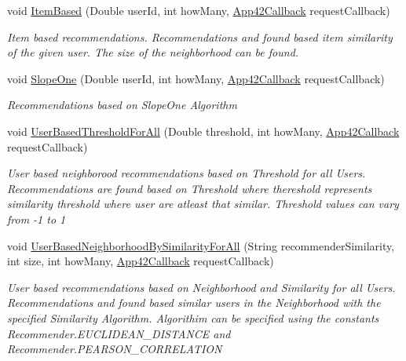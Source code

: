 \begin{DoxyCompactItemize}
void \hyperlink{classcom_1_1shephertz_1_1app42_1_1paas_1_1sdk_1_1windows_1_1recommend_1_1_recommender_service_ae8b92d81350f99f29cbaaeb1c139931e}{Item\+Based} (Double user\+Id, int how\+Many, \hyperlink{interfacecom_1_1shephertz_1_1app42_1_1paas_1_1sdk_1_1windows_1_1_app42_callback}{App42\+Callback} request\+Callback)
\begin{DoxyCompactList}\small\item\em Item based recommendations. Recommendations and found based item similarity of the given user. The size of the neighborhood can be found. \end{DoxyCompactList}\item 
void \hyperlink{classcom_1_1shephertz_1_1app42_1_1paas_1_1sdk_1_1windows_1_1recommend_1_1_recommender_service_ad9b1f1dbf68fb11d66477a5fc380e780}{Slope\+One} (Double user\+Id, int how\+Many, \hyperlink{interfacecom_1_1shephertz_1_1app42_1_1paas_1_1sdk_1_1windows_1_1_app42_callback}{App42\+Callback} request\+Callback)
\begin{DoxyCompactList}\small\item\em Recommendations based on Slope\+One Algorithm \end{DoxyCompactList}\item 
void \hyperlink{classcom_1_1shephertz_1_1app42_1_1paas_1_1sdk_1_1windows_1_1recommend_1_1_recommender_service_ad114e00882736dd6465af133a12eb93e}{User\+Based\+Threshold\+For\+All} (Double threshold, int how\+Many, \hyperlink{interfacecom_1_1shephertz_1_1app42_1_1paas_1_1sdk_1_1windows_1_1_app42_callback}{App42\+Callback} request\+Callback)
\begin{DoxyCompactList}\small\item\em User based neighborood recommendations based on Threshold for all Users. Recommendations are found based on Threshold where thereshold represents similarity threshold where user are atleast that similar. Threshold values can vary from -\/1 to 1 \end{DoxyCompactList}\item 
void \hyperlink{classcom_1_1shephertz_1_1app42_1_1paas_1_1sdk_1_1windows_1_1recommend_1_1_recommender_service_a7d2ec3c8474e5b1510e21e0212166228}{User\+Based\+Neighborhood\+By\+Similarity\+For\+All} (String recommender\+Similarity, int size, int how\+Many, \hyperlink{interfacecom_1_1shephertz_1_1app42_1_1paas_1_1sdk_1_1windows_1_1_app42_callback}{App42\+Callback} request\+Callback)
\begin{DoxyCompactList}\small\item\em User based recommendations based on Neighborhood and Similarity for all Users. Recommendations and found based similar users in the Neighborhood with the specified Similarity Algorithm. Algorithim can be specified using the constants Recommender.\+E\+U\+C\+L\+I\+D\+E\+A\+N\+\_\+\+D\+I\+S\+T\+A\+N\+C\+E and Recommender.\+P\+E\+A\+R\+S\+O\+N\+\_\+\+C\+O\+R\+R\+E\+L\+A\+T\+I\+O\+N \end{DoxyCompactList}\item 

\end{DoxyCompactItemize}
